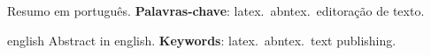 \begin{resumo}
Resumo em português.
\vspace{\onelineskip}
\noindent
\textbf{Palavras-chave}: latex.\ abntex.\ editoração de texto.
\end{resumo}

\begin{resumo}[Abstract]
\begin{otherlanguage*}{english}
Abstract in english.
\vspace{\onelineskip}
\noindent
\textbf{Keywords}: latex.\ abntex.\ text publishing.
\end{otherlanguage*}
\end{resumo}
\clearpage{}
